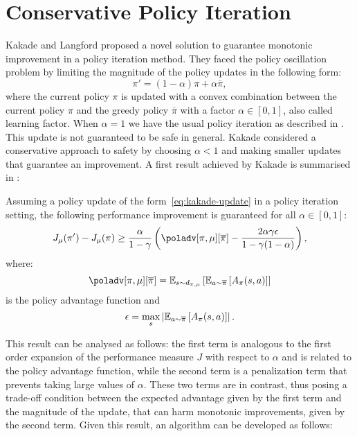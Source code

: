 \section{Conservative Policy Iteration}
\label{sec:cpi}
Kakade and Langford \cite{Kakade02approximatelyoptimal} proposed a novel solution to guarantee monotonic improvement in a policy iteration method. They faced the policy oscillation problem by limiting the magnitude of the policy updates in the following form:
\begin{equation}
\pi' = (1-\alpha )\pi + \alpha\overline{\pi}, \label{eq:kakade-update}
\end{equation}
where the current policy $\pi$ is updated with a convex combination between the current policy $\pi$ and the greedy policy $\overline{\pi}$ with a factor $\alpha \in [0,1]$, also called learning factor.
When $\alpha = 1$ we have the usual policy iteration as described in . This update is not guaranteed to be safe in general. Kakade considered a conservative approach to safety by choosing $\alpha < 1$ and making smaller updates that guarantee an improvement.
A first result achieved by Kakade is summarised in :
\begin{theorem}
\label{th:kakade1}
Assuming a policy update of the form~\ref{eq:kakade-update} in a policy iteration setting, the following performance improvement is guaranteed for all $\alpha \in [0,1]$:
\begin{equation}
J_{\mu}(\pi') - J_{\mu}(\pi) \geq \frac{\alpha}{1 - \gamma}\left( \poladv[\pi, \mu][\overline{\pi}] - \frac{2\alpha \gamma \epsilon}{1 - \gamma (1 - \alpha)} \right), \label{eq:kakade-improvement}
\end{equation}
where:
\begin{equation}
\poladv[\pi, \mu][\overline{\pi}] = \EV[s\sim d_{\pi, \mu}]{ \EV[a\sim\overline{\pi}]{A_{\pi}(s,a)}}
\end{equation}
is the policy advantage function and
\begin{equation}
\epsilon = \max_s \left| \EV[a\sim\overline{\pi}]{A_{\pi}(s,a)} \right|.
\end{equation}
\end{theorem}

This result can be analysed as follows: the first term is analogous to the first order expansion of the performance measure $J$ with respect to $\alpha$ and is related to the policy advantage function, while the second term is a penalization term that prevents taking large values of $\alpha$. These two terms are in contrast, thus posing a trade-off condition between the expected advantage given by the first term and the magnitude of the update, that can harm monotonic improvements, given by the second term. Given this result, an algorithm can be developed as follows:

